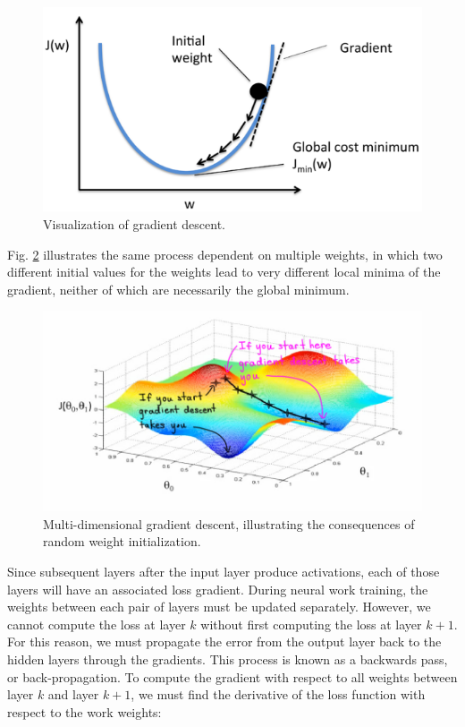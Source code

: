 \documentclass{article}
\begin{document}
\begin{figure}[h]
\centering
\includegraphics[scale=0.6]{figs/gd.png}
\caption{Visualization of gradient descent. \cite{gd}}
\label{fig:gd}
\end{figure}

Fig. \ref{fig:gd_3d} illustrates the same process dependent on multiple weights, in which two different initial values for the weights lead to very different local minima of the gradient, neither of which are necessarily the global minimum. 

\begin{figure}[h]
\centering
\includegraphics[scale=0.5]{figs/gd_3d.jpeg}
\caption{Multi-dimensional gradient descent, illustrating the consequences of random weight initialization. \cite{gd_3d}}
\label{fig:gd_3d}
\end{figure}


Since subsequent layers after the input layer produce activations, each of those layers will have an associated loss gradient. During neural work training, the weights between each pair of layers must be updated separately.  However, we cannot compute the loss at layer $k$ without first computing the loss at layer $k + 1$. For this reason, we must propagate the error from the output layer back to the hidden layers through the gradients. This process is known as a backwards pass, or back-propagation. To compute the gradient with respect to all weights between layer $k$ and layer $k + 1$, we must find the derivative of the loss function with respect to the work weights:
\end{document}
